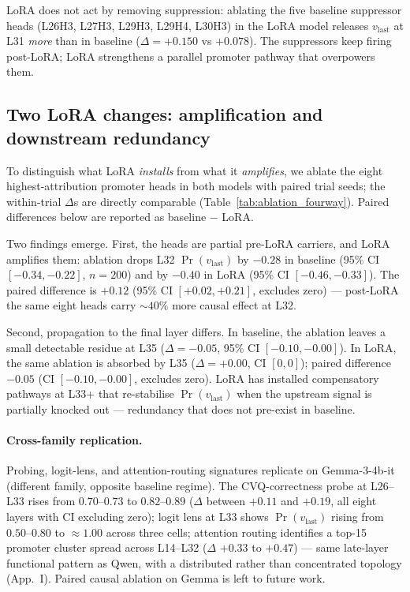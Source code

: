 \documentclass[letterpaper]{article} %
\begin{document}
LoRA does not act by removing suppression: ablating the five
baseline suppressor heads (L26H3, L27H3, L29H3, L29H4, L30H3) in
the LoRA model releases $v_{\text{last}}$ at L31 \emph{more} than
in baseline ($\Delta{=}{+}0.150$ vs $+0.078$). The suppressors
keep firing post-LoRA; LoRA strengthens a parallel promoter
pathway that overpowers them.

\subsection{Two LoRA changes: amplification and downstream
redundancy}
\label{sec:mechanism:causal}

To distinguish what LoRA \emph{installs} from what it
\emph{amplifies}, we ablate the eight highest-attribution promoter
heads in both models with paired trial seeds; the within-trial
$\Delta$s are directly comparable (Table~\ref{tab:ablation_fourway}).
Paired differences below are reported as baseline $-$ LoRA.

Two findings emerge. First, the heads are partial pre-LoRA
carriers, and LoRA amplifies them: ablation drops L32
$\Pr(v_{\text{last}})$ by $-0.28$ in baseline (95\% CI
$[-0.34, -0.22]$, $n{=}200$) and by $-0.40$ in LoRA (95\% CI
$[-0.46, -0.33]$). The paired difference is $+0.12$ (95\% CI
$[+0.02, +0.21]$, excludes zero) --- post-LoRA the same eight
heads carry $\sim 40\%$ more causal effect at L32.

Second, propagation to the final layer differs. In baseline, the
ablation leaves a small detectable residue at L35
($\Delta {=} {-}0.05$, 95\% CI $[-0.10, -0.00]$). In LoRA, the
same ablation is absorbed by L35 ($\Delta {=} {+}0.00$, CI
$[0, 0]$); paired difference $-0.05$ (CI $[-0.10, -0.00]$,
excludes zero). LoRA has installed compensatory pathways at L33+
that re-stabilise $\Pr(v_{\text{last}})$ when the upstream signal
is partially knocked out --- redundancy that does not pre-exist in
baseline.

\paragraph{Cross-family replication.}
Probing, logit-lens, and attention-routing signatures replicate on
Gemma-3-4b-it (different family, opposite baseline regime). The
CVQ-correctness probe at L26--L33 rises from $0.70$--$0.73$ to
$0.82$--$0.89$ ($\Delta$ between $+0.11$ and $+0.19$, all eight
layers with CI excluding zero); logit lens at L33 shows
$\Pr(v_{\text{last}})$ rising from $0.50$--$0.80$ to $\approx 1.00$
across three cells; attention routing identifies a top-15
promoter cluster spread across L14--L32 ($\Delta$ $+0.33$ to
$+0.47$) --- same late-layer functional pattern as Qwen, with a
distributed rather than concentrated topology
(App.~I). Paired causal ablation on Gemma
is left to future work.
\end{document}
